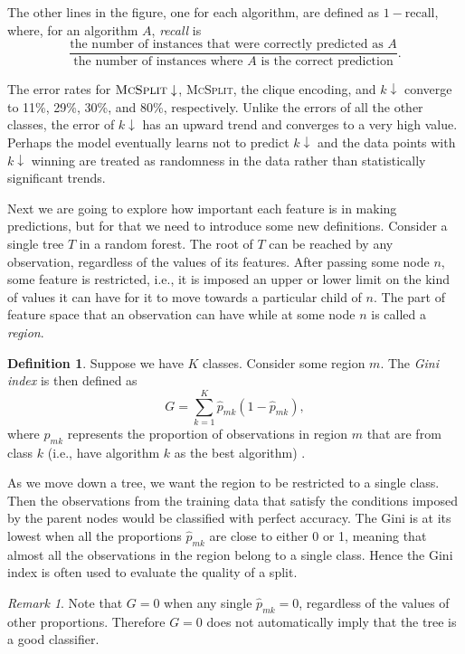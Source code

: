 \documentclass{l4proj}
\theoremstyle{definition}
\newtheorem{definition}{Definition}[section]
\theoremstyle{remark}
\newtheorem{remark}{Remark}[section]
\begin{document}
The other lines in the figure, one for each algorithm, are defined as $1 -
\text{recall}$, where, for an algorithm $A$, \emph{recall}
\cite{citeulike:12882259} is
\[ \frac{\text{the number of instances that were correctly predicted as
      $A$}}{\text{the number of instances where $A$ is the correct
      prediction}}. \]

The error rates for $\textsc{McSplit}\downarrow$, \textsc{McSplit}, the clique
encoding, and $k\downarrow$ converge to 11\%, 29\%, 30\%, and 80\%,
respectively. Unlike the errors of all the other classes, the error of
$k\downarrow$ has an upward trend and converges to a very high value. Perhaps
the model eventually learns not to predict $k\downarrow$ and the data points
with $k\downarrow$ winning are treated as randomness in the data rather than
statistically significant trends.

Next we are going to explore how important each feature is in making
predictions, but for that we need to introduce some new definitions. Consider a
single tree $T$ in a random forest. The root of $T$ can be reached by any
observation, regardless of the values of its features. After passing some node
$n$, some feature is restricted, i.e., it is imposed an upper or lower limit on
the kind of values it can have for it to move towards a particular child of $n$.
The part of feature space that an observation can have while at some node $n$ is
called a \emph{region}.

\begin{definition}
  Suppose we have $K$ classes. Consider some region $m$. The \emph{Gini index}
  is then defined as
  \[ G = \sum_{k=1}^K \hat{p}_{mk}(1-\hat{p}_{mk}), \]
  where $\hat{p}_{mk}$ represents the proportion of observations in region $m$
  that are from class $k$ (i.e., have algorithm $k$ as the best algorithm)
  \cite{James:2014:ISL:2517747}.
\end{definition}

As we move down a tree, we want the region to be restricted to a single class.
Then the observations from the training data that satisfy the conditions imposed
by the parent nodes would be classified with perfect accuracy. The Gini is at
its lowest when all the proportions $\hat{p}_{mk}$ are close to either 0 or 1,
meaning that almost all the observations in the region belong to a single class.
Hence the Gini index is often used to evaluate the quality of a split.

\begin{remark}
  Note that $G=0$ when any single $\hat{p}_{mk}=0$, regardless of the values of
  other proportions. Therefore $G=0$ does not automatically imply that the tree
  is a good classifier.
\end{remark}
\end{document}
